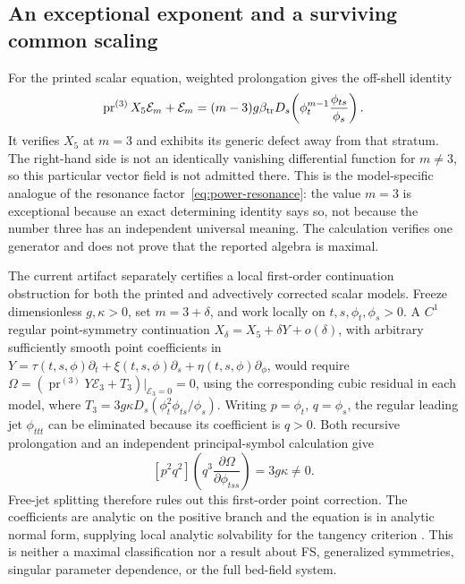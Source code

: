 \documentclass[11pt]{article}
\theoremstyle{definition}
\newcommand{\E}{\mathcal E}
\newcommand{\pr}{\operatorname{pr}}
\begin{document}
\subsection{An exceptional exponent and a surviving common scaling}
For the printed scalar equation, weighted prolongation gives the off-shell
identity
\begin{equation}
 \pr^{(3)}X_5\E_m+\E_m
  =(m-3)g\beta_{\rm tr}D_s\!\left(
        \phi_t^{m-1}\frac{\phi_{ts}}{\phi_s}\right).
 \label{eq:sve-defect}
\end{equation}
It verifies $X_5$ at $m=3$ and exhibits its generic defect away from that
stratum. The right-hand side is not an identically vanishing differential
function for $m\ne3$, so this particular vector field is not admitted there.
This is the model-specific analogue of the resonance
factor~\eqref{eq:power-resonance}: the value $m=3$ is exceptional because an
exact determining identity says so, not because the number three has an
independent universal meaning. The calculation verifies one generator and
does not prove that the reported algebra is maximal.

The current artifact separately certifies a local first-order continuation
obstruction for both the printed and advectively corrected scalar models. Freeze
dimensionless $g,\kappa>0$, set $m=3+\delta$, and work locally on
$t,s,\phi_t,\phi_s>0$. A $C^1$ regular point-symmetry continuation
$X_\delta=X_5+\delta Y+o(\delta)$, with arbitrary sufficiently smooth
point coefficients in $Y=\tau(t,s,\phi)\partial_t+
\xi(t,s,\phi)\partial_s+\eta(t,s,\phi)\partial_\phi$, would require
$\Omega=(\pr^{(3)}Y\E_3+T_3)|_{\E_3=0}=0$, using the corresponding
cubic residual in each model, where
$T_3=3g\kappa D_s(\phi_t^2\phi_{ts}/\phi_s)$.
Writing $p=\phi_t$, $q=\phi_s$, the regular leading jet
$\phi_{ttt}$ can be eliminated because its coefficient is $q>0$.
Both recursive prolongation and an independent principal-symbol calculation give
\[
 [p^2q^2]\!\left(q^3\frac{\partial\Omega}{\partial\phi_{tss}}\right)
 =3g\kappa\ne0.
\]
Free-jet splitting therefore rules out this first-order point correction.
The coefficients are analytic on the positive branch and the equation is in
analytic normal form, supplying local analytic solvability for the tangency
criterion \cite{olver}. This is neither a maximal classification nor a result
about FS, generalized symmetries, singular parameter dependence, or the full
bed-field system.
\end{document}
